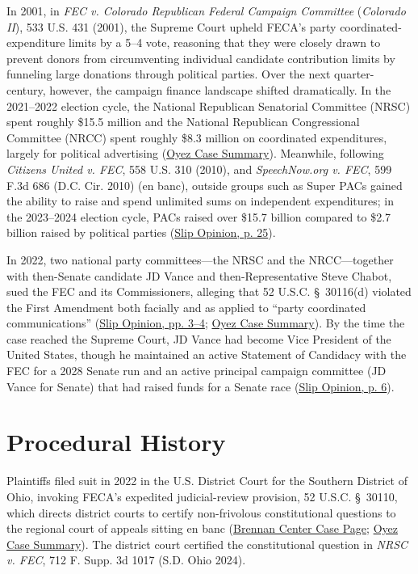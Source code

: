\documentclass[12pt]{article}
\begin{document}
In 2001, in \textit{FEC v. Colorado Republican Federal Campaign Committee} (\textit{Colorado II}), 533 U.S. 431 (2001), the Supreme Court upheld FECA's party coordinated-expenditure limits by a 5--4 vote, reasoning that they were closely drawn to prevent donors from circumventing individual candidate contribution limits by funneling large donations through political parties. Over the next quarter-century, however, the campaign finance landscape shifted dramatically. In the 2021--2022 election cycle, the National Republican Senatorial Committee (NRSC) spent roughly \$15.5 million and the National Republican Congressional Committee (NRCC) spent roughly \$8.3 million on coordinated expenditures, largely for political advertising (\href{https://www.oyez.org/cases/2025/24-621}{Oyez Case Summary}). Meanwhile, following \textit{Citizens United v. FEC}, 558 U.S. 310 (2010), and \textit{SpeechNow.org v. FEC}, 599 F.3d 686 (D.C. Cir. 2010) (en banc), outside groups such as Super PACs gained the ability to raise and spend unlimited sums on independent expenditures; in the 2023--2024 election cycle, PACs raised over \$15.7 billion compared to \$2.7 billion raised by political parties (\href{https://www.supremecourt.gov/opinions/25pdf/24-621_h315.pdf}{Slip Opinion, p. 25}).

In 2022, two national party committees---the NRSC and the NRCC---together with then-Senate candidate JD Vance and then-Representative Steve Chabot, sued the FEC and its Commissioners, alleging that 52 U.S.C. \S~30116(d) violated the First Amendment both facially and as applied to ``party coordinated communications'' (\href{https://www.supremecourt.gov/opinions/25pdf/24-621_h315.pdf}{Slip Opinion, pp. 3--4}; \href{https://www.oyez.org/cases/2025/24-621}{Oyez Case Summary}). By the time the case reached the Supreme Court, JD Vance had become Vice President of the United States, though he maintained an active Statement of Candidacy with the FEC for a 2028 Senate run and an active principal campaign committee (JD Vance for Senate) that had raised funds for a Senate race (\href{https://www.supremecourt.gov/opinions/25pdf/24-621_h315.pdf}{Slip Opinion, p. 6}).

\section{Procedural History}
Plaintiffs filed suit in 2022 in the U.S. District Court for the Southern District of Ohio, invoking FECA's expedited judicial-review provision, 52 U.S.C. \S~30110, which directs district courts to certify non-frivolous constitutional questions to the regional court of appeals sitting en banc (\href{https://www.brennancenter.org/our-work/research-reports/national-republican-senatorial-committee-v-federal-election-commission}{Brennan Center Case Page}; \href{https://www.oyez.org/cases/2025/24-621}{Oyez Case Summary}). The district court certified the constitutional question in \textit{NRSC v. FEC}, 712 F. Supp. 3d 1017 (S.D. Ohio 2024).
\end{document}
